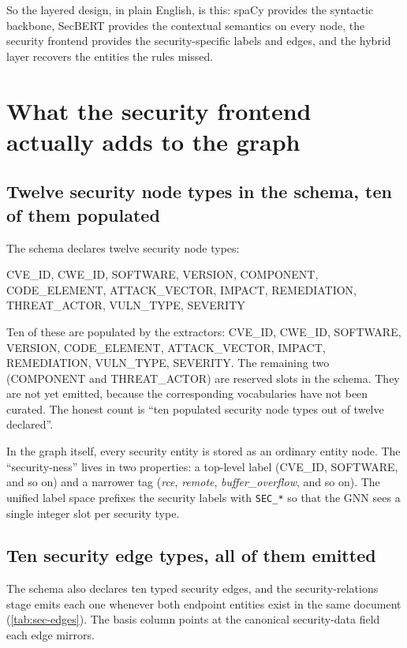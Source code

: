 \documentclass[11pt,a4paper]{article}
\begin{document}
So the layered design, in plain English, is this: spaCy
provides the syntactic backbone, SecBERT provides the
contextual semantics on every node, the security frontend
provides the security-specific labels and edges, and the
hybrid layer recovers the entities the rules missed.

\section{What the security frontend actually adds to the graph}
\label{sec:inventory}

\subsection{Twelve security node types in the schema,
            ten of them populated}

The schema declares twelve security node types:

\begin{center}\small
CVE\_ID, CWE\_ID, SOFTWARE, VERSION, COMPONENT,
CODE\_ELEMENT, ATTACK\_VECTOR, IMPACT, REMEDIATION,
THREAT\_ACTOR, VULN\_TYPE, SEVERITY
\end{center}

Ten of these are populated by the extractors: CVE\_ID,
CWE\_ID, SOFTWARE, VERSION, CODE\_ELEMENT, ATTACK\_VECTOR,
IMPACT, REMEDIATION, VULN\_TYPE, SEVERITY. The remaining
two (COMPONENT and THREAT\_ACTOR) are reserved slots in the
schema. They are not yet emitted, because the corresponding
vocabularies have not been curated. The honest count is
``ten populated security node types out of twelve declared''.

In the graph itself, every security entity is stored as an
ordinary entity node. The ``security-ness'' lives in two
properties: a top-level label (CVE\_ID, SOFTWARE, and so on)
and a narrower tag (\emph{rce}, \emph{remote},
\emph{buffer\_overflow}, and so on). The unified label
space prefixes the security labels with \texttt{SEC\_*} so
that the GNN sees a single integer slot per security type.

\subsection{Ten security edge types, all of them emitted}

The schema also declares ten typed security edges, and the
security-relations stage emits each one whenever both
endpoint entities exist in the same document
(\autoref{tab:sec-edges}). The basis column points at the
canonical security-data field each edge mirrors.
\end{document}
